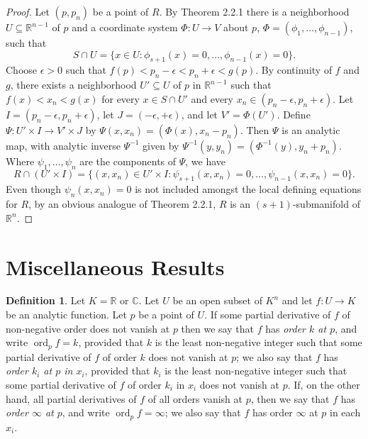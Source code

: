 \documentclass[11pt]{article}
\theoremstyle{plain}
\theoremstyle{definition}
\newtheorem*{definition}{Definition}
\newcommand{\R}{\mathbb{R}}
\newcommand{\C}{\mathbb{C}}
\DeclareMathOperator{\ord}{ord}
\begin{document}
\begin{proof}
Let $(p, p_n)$ be a point of $R$. By Theorem 2.2.1 there is a
neighborhood $U \subseteq \R^{n-1}$ of $p$ and a coordinate system
$\Phi: U \to V$ about $p$, $\Phi = (\phi_1, \ldots, \phi_{n-1})$, such
that
\[
S \cap U = \{ x \in U : \phi_{s+1}(x) = 0, \ldots, \phi_{n-1}(x) = 0 \}.
\]
Choose $\epsilon > 0$ such that $f(p) < p_n - \epsilon < p_n + \epsilon < g(p)$.
By continuity of $f$ and $g$, there exists a neighborhood
$U' \subseteq U$ of $p$ in $\R^{n-1}$ such that $f(x) < x_n < g(x)$ for
every $x \in S \cap U'$ and every $x_n \in (p_n - \epsilon, p_n + \epsilon)$.
Let $I = (p_n - \epsilon, p_n + \epsilon)$, let
$J = (-\epsilon, +\epsilon)$, and let $V' = \Phi(U')$. Define
$\Psi: U' \times I \to V' \times J$ by
$\Psi(x, x_n) = (\Phi(x), x_n - p_n)$. Then $\Psi$ is an analytic map,
with analytic inverse $\Psi^{-1}$ given by
$\Psi^{-1}(y, y_n) = (\Phi^{-1}(y), y_n + p_n)$. Where
$\psi_1, \ldots, \psi_n$ are the components of $\Psi$, we have
\[
R \cap (U' \times I) = \{ (x, x_n) \in U' \times I :
\psi_{s+1}(x, x_n) = 0, \ldots, \psi_{n-1}(x, x_n) = 0 \}.
\]
Even though $\psi_n(x, x_n) = 0$ is not included amongst the local
defining equations for $R$, by an obvious analogue of Theorem 2.2.1,
$R$ is an $(s+1)$-submanifold of $\R^n$.
\end{proof}

\section{Miscellaneous Results}

\begin{definition}
Let $K = \R$ or $\C$. Let $U$ be an open subset of $K^n$ and let
$f: U \to K$ be an analytic function. Let $p$ be a point of $U$. If some
partial derivative of $f$ of non-negative order does not vanish at $p$
then we say that $f$ has \emph{order $k$ at $p$}, and write
$\ord_p f = k$, provided that $k$ is the least non-negative integer such
that some partial derivative of $f$ of order $k$ does not vanish at $p$;
we also say that $f$ has \emph{order $k_i$ at $p$ in $x_i$}, provided
that $k_i$ is the least non-negative integer such that some partial
derivative of $f$ of order $k_i$ in $x_i$ does not vanish at $p$. If,
on the other hand, all partial derivatives of $f$ of all orders vanish
at $p$, then we say that $f$ has \emph{order $\infty$ at $p$}, and write
$\ord_p f = \infty$; we also say that $f$ has order $\infty$ at $p$ in
each $x_i$.
\end{definition}
\end{document}

